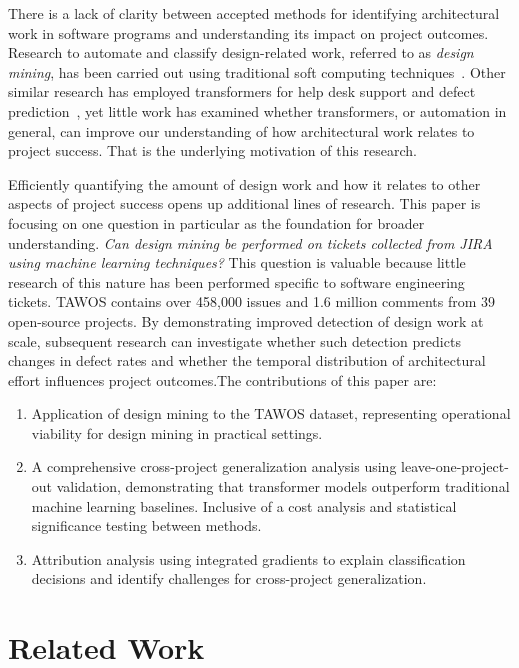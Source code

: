 \documentclass[preprint,12pt]{elsarticle}
\begin{document}
There is a lack of clarity between accepted methods for identifying architectural work in software programs and understanding its impact on project outcomes. Research to automate and classify design-related work, referred to as \emph{design mining}, has been carried out using traditional soft computing techniques~\cite{mahadi2021}. Other similar research has employed transformers for help desk support and defect prediction~\cite{incekas2024, zangari2023}, yet little work has examined whether transformers, or automation in general, can improve our understanding of how architectural work relates to project success. That is the underlying motivation of this research.

Efficiently quantifying the amount of design work and how it relates to other aspects of project success opens up additional lines of research. This paper is focusing on one question in particular as the foundation for broader understanding. \emph{Can design mining be performed on tickets collected from JIRA using machine learning techniques?} This question is valuable because little research of this nature has been performed specific to software engineering tickets.  TAWOS contains over 458,000 issues and 1.6 million comments from 39 open-source projects. By demonstrating improved detection of design work at scale, subsequent research can investigate whether such detection predicts changes in defect rates and whether the temporal distribution of architectural effort influences project outcomes.The contributions of this paper are:

\begin{enumerate}
\item Application of design mining to the TAWOS dataset, representing operational viability for design mining in practical settings.
\item A comprehensive cross-project generalization analysis using leave-one-project-out validation, demonstrating that transformer models outperform traditional machine learning baselines. Inclusive of a cost analysis and statistical significance testing between methods.
\item Attribution analysis using integrated gradients to explain classification decisions and identify challenges for cross-project generalization.
\end{enumerate}

\section{Related Work}
\end{document}

